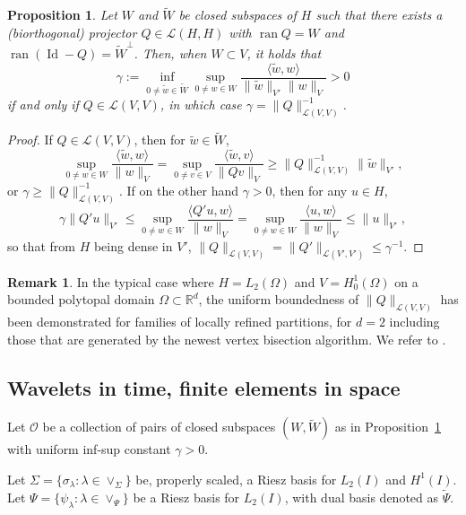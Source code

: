 \documentclass[11pt,a4paper,oneside,english]{amsart}
\numberwithin{equation}{section}
\numberwithin{theorem}{section}
\newtheorem{prop}[theorem]{Proposition}
\theoremstyle{definition}
\newtheorem{remark}[theorem]{Remark}
\newcommand{\R}{\mathbb{R}}
\newcommand{\la}{\langle}
\newcommand{\ra}{\rangle}
\DeclareMathOperator*{\Id}{Id}
\newcommand{\cL}{\mathcal L}
\newcommand{\jw}[1]{{\color{red}{JW: #1}}}
\newcommand{\rvv}[1]{{\color{teal}{RvV: #1}}}
\DeclareMathOperator*{\ran}{ran}
\begin{document}
\begin{prop} \label{prop:space-infsup}
  Let $W$ and $\tilde W$ be closed subspaces of $H$ such that there exists a
  (biorthogonal) projector $Q \in \cL(H,H)$ with $\ran Q=W$ and $\ran (\Id -Q)={\tilde W}^\perp$. 
  Then, when $W \subset V$, it holds that 
  \[
    \gamma:=\inf_{0 \neq \tilde w \in \tilde W}\sup_{0 \neq w \in W}\frac{\la \tilde w,w\ra}{\|\tilde w\|_{V'}\|w\|_V}>0
  \]
  if and only if $Q \in \cL(V,V)$, in which case $\gamma=\|Q\|_{\cL(V,V)}^{-1}$.
\end{prop}
\begin{proof} \jw{Dit ben ik nog niet nagegaan.} If $Q\in \cL(V,V)$, then for $\tilde w \in \tilde W$,
$$
\sup_{0 \neq w \in W}\frac{\la \tilde w,w\ra}{\|w\|_V}=\sup_{0 \neq v \in V}\frac{\la \tilde w, v\ra}{\|Qv\|_V}
\geq \|Q\|_{\cL(V,V)}^{-1} \|\tilde w\|_{V'},
$$
or $\gamma \geq \|Q\|_{\cL(V,V)}^{-1}$. If on the other hand $\gamma>0$, then for any $u \in H$,
$$
\gamma \|Q' u\|_{V'} \leq \sup_{0 \neq w \in W}\frac{\la Q'u,w\ra}{\|w\|_V} =
 \sup_{0 \neq w \in W}\frac{\la u,w\ra}{\|w\|_V} \leq \|u\|_{V'},
 $$
so that from $H$ being dense in $V'$, $\|Q\|_{\cL(V,V)}=\|Q'\|_{\cL(V',V')}\leq \gamma^{-1}$.
\end{proof}
\begin{remark}
  In the typical case where $H = L_2(\Omega)$ and $V = H_0^1(\Omega)$ on a bounded
  polytopal domain $\Omega \subset \R^d$, the uniform boundedness of $\|Q\|_{\cL(V,V)}$
  has been demonstrated for families of locally refined partitions, for $d=2$
  including those that are generated by the newest vertex bisection algorithm.
  We refer to \cite{Carstensen2001a,Gaspoz2016}. \jw{Misschien is het ``$H^1$-stability
  of $L^2$-projection" inmiddels wel uitgespeeld. ik vond ook een werk uit
  2014 van de groep van Dirk, en dit werkte voor elke dimensie, maar enkel op
  vreemde fin.elts. Ook een werk uit 2019 van Gaspoz, Heine, Siebert waar het
  2d-NVB geval wordt bekeken voor Lagrange-fin elts tot graad 4.}
\end{remark}

\subsection{Wavelets in time, finite elements in space}
Let ${\mathcal O}$ be a collection of pairs of closed subspaces $(W,\tilde{W})$
as in Proposition~\ref{prop:space-infsup} with uniform inf-sup constant $\gamma>0$.

Let $\Sigma=\{\sigma_\lambda : \lambda \in \vee_\Sigma\}$ be, properly scaled, a Riesz basis for $L_2(I)$ and $H^1(I)$.\rvv{Definitie maken ergens?}
Let $\Psi=\{\psi_\lambda \colon \lambda \in \vee_\Psi\}$ be a Riesz basis for $L_2(I)$, with dual basis denoted as $\tilde{\Psi}$.
\end{document}

